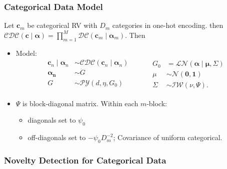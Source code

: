 \documentclass[aspectratio=169,10pt]{beamer}
\begin{document}
\begin{frame}
    \frametitle{Categorical Data Model}
    Let $\bm{c}_m$ be categorical RV with $D_m$ categories in one-hot encoding.  
    then $\mathcal{CDC}(\bm{c}\mid\bm{\alpha}) = 
        \prod_{m = 1}^M \mathcal{DC}(\bm{c}_m\mid\bm{\alpha}_m)$.  
        Then
    \begin{itemize}
    \item Model:
    \[
    \begin{aligned}
      \bm{c}_n \mid \bm{\alpha}_n &\sim 
        \mathcal{CDC}\left(\bm{c}_n\mid\bm{\alpha}_n\right)\\
      \bm{\alpha_n} &\sim G\\
      G &\sim \mathcal{PY}\left(d, \eta, G_0\right)\\
      \end{aligned}
      ~\hspace{1cm}
      \begin{aligned}
      G_0 &= \mathcal{LN}\left(\bm{\alpha}\mid\bm{\mu},\Sigma\right)\\
      \mu &\sim \mathcal{N}\left(\bm{0},\bm{1}\right)\\
      \Sigma &\sim \mathcal{IW}\left(\nu, \Psi\right).
      \end{aligned}
      \]
    \item $\Psi$ is block-diagonal matrix.  Within each $m$-block:
    \begin{itemize}
        \item diagonals set to $\psi_0$
        \item off-diagonals set to $-\psi_0D_m^{-2}$; Covariance of uniform categorical.
    \end{itemize}
    \end{itemize}    
\end{frame} %

\subsubsection{Novelty Detection for Categorical Data}
\end{document}
